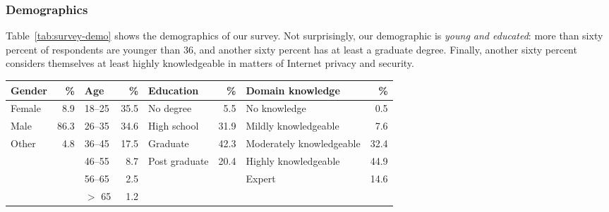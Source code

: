 \subsubsection{Demographics}
Table~\ref{tab:survey-demo} shows the demographics of our survey.  Not
surprisingly, our demographic is \emph{young and educated}: more than sixty
percent of respondents are younger than 36, and another sixty percent has at
least a graduate degree.  Finally, another sixty percent considers themselves
at least highly knowledgeable in matters of Internet privacy and security.

\begin{table*}[ht]
	\centering
	\begin{tabular}{l r l r l r l r}
	\toprule
	Gender & \% &
	Age & \% &
	Education & \% &
	Domain knowledge & \% \\
	\midrule
	Female & 8.9  & 18--25   & 35.5 & No degree     & 5.5  & No knowledge             & 0.5  \\
	Male   & 86.3 & 26--35   & 34.6 & High school   & 31.9 & Mildly knowledgeable     & 7.6  \\
	Other  & 4.8  & 36--45   & 17.5 & Graduate      & 42.3 & Moderately knowledgeable & 32.4 \\
	       &      & 46--55   & 8.7  & Post graduate & 20.4 & Highly knowledgeable     & 44.9 \\
	       &      & 56--65   & 2.5  &               &      & Expert                   & 14.6 \\
	       &      & $>$ 65   & 1.2  &               &      & & \\
	\bottomrule
	\end{tabular}
	\caption{The distribution over gender, age, education, and domain knowledge 
	for our 621 interview subjects.}
	\label{tab:survey-demo}
\end{table*}

